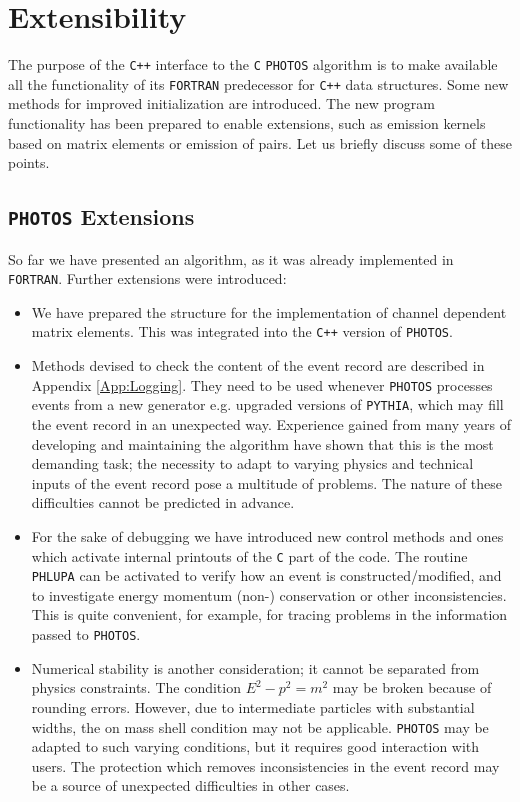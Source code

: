 \documentclass[]{Photos_interface_design}
\begin{document}
\section{Extensibility}
\label{sec:extensibility}
 The purpose of the {\tt C++} interface to the {\tt C} {\tt PHOTOS} algorithm is to make available 
all the functionality of its {\tt FORTRAN} predecessor for 
{\tt C++} data
structures. Some new methods for improved initialization are introduced. The new program 
functionality has been prepared to enable extensions, such as emission kernels based on matrix elements
or emission of pairs. 
Let us briefly discuss some of these points.

\subsection{{\tt PHOTOS} Extensions}
So far  we have presented an algorithm, as it was 
already implemented in {\tt FORTRAN}. Further extensions were introduced:  

\begin{itemize}


\item
We have prepared the structure 
for the implementation of channel dependent matrix elements. This was   
integrated into the {\tt C++} version of {\tt PHOTOS}. 

\item
Methods devised to check the content of the event record are described in Appendix \ref{App:Logging}. 
They need to be used whenever {\tt PHOTOS} 
processes events from a new generator e.g. upgraded versions of  {\tt PYTHIA},
which may fill the event record in an unexpected way.
Experience gained from many years of developing and maintaining the algorithm
have shown that this is the most demanding task; the necessity to
adapt to varying physics and technical inputs of the event record pose
a multitude of problems. The nature of these difficulties cannot be
predicted in advance. 

\item
For the sake of debugging we have introduced new control methods 
and ones which activate
internal printouts of the {\tt C} part of the code.
The routine {\tt PHLUPA} \cite{Barberio:1993qi} can be activated  to verify 
how an event is constructed/modified, and to investigate energy 
momentum (non-) conservation or other inconsistencies.
This is quite convenient, for example, for tracing problems in the
information passed to {\tt PHOTOS}.


\item
Numerical stability is another consideration; it cannot be separated from
physics constraints. The condition  $E^2-p^2=m^2$ may be broken  because of 
rounding errors.  However, due to intermediate particles with
  substantial widths, the on mass shell condition may not be applicable.
{\tt PHOTOS} may be adapted to such varying conditions, but it requires
good interaction with users. The protection which removes 
inconsistencies in the event record may be a source of unexpected difficulties
in other cases. 
\end{itemize}
\end{document}
